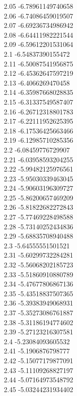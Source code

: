 {2.05	-6.78961149740658\\
2.06	-6.74086459019507\\
2.07	-6.69236734986942\\
2.08	-6.64411982221544\\
2.09	-6.59612201531064\\
2.1	-6.54837390155472\\
2.11	-6.50087541956875\\
2.12	-6.45362647597219\\
2.13	-6.4066269470458\\
2.14	-6.35987668028835\\
2.15	-6.31337549587407\\
2.16	-6.26712318801783\\
2.17	-6.22111952625395\\
2.18	-6.17536425663466\\
2.19	-6.12985710285356\\
2.2	-6.08459776729907\\
2.21	-6.03958593204255\\
2.22	-5.99482125976561\\
2.23	-5.95030339463045\\
2.24	-5.90603196309727\\
2.25	-5.86200657469209\\
2.26	-5.81822682272843\\
2.27	-5.77469228498588\\
2.28	-5.73140252434836\\
2.29	-5.68835708940488\\
2.3	-5.64555551501521\\
2.31	-5.60299732284281\\
2.32	-5.56068202185723\\
2.33	-5.51860910880789\\
2.34	-5.47677806867136\\
2.35	-5.43518837507365\\
2.36	-5.39383949068931\\
2.37	-5.35273086761887\\
2.38	-5.31186194774602\\
2.39	-5.27123216307581\\
2.4	-5.23084093605532\\
2.41	-5.1906876798777\\
2.42	-5.15077179877091\\
2.43	-5.11109268827197\\
2.44	-5.07164973548792\\
2.45	-5.03244231934402\\
}

